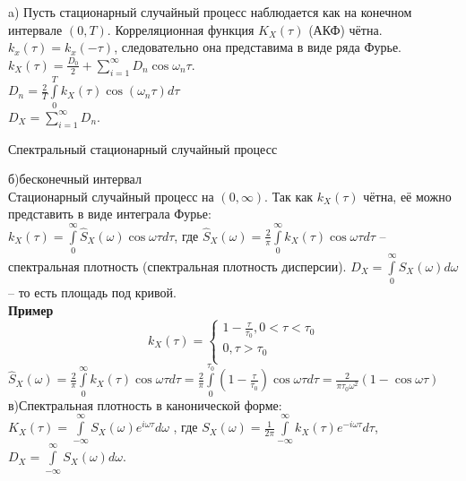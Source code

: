 \documentclass[russian, 12pt, fleqn]{article}
\begin{document}
a) Пусть стационарный случайный процесс наблюдается как на конечном интервале $(0, T)$. Корреляционная функция $K_X(\tau)$ (АКФ) чётна. $k_x(\tau) = k_x(-\tau)$, следовательно она представима в виде ряда Фурье. $k_X(\tau) = \frac{D_0}{2} +  \displaystyle{\sum \limits_{i = 1}^{\infty}} D_n \cos \omega_n \tau$.\\
$D_n = \frac{2}{T} \displaystyle{\int \limits _{0} ^ {T}} k_X (\tau) \cos(\omega_n \tau) d\tau$\\
$D_X =   \displaystyle{\sum \limits_{i = 1}^{\infty}} D_n$.
\begin{center}
$\textbf{Спектральный стационарный случайный процесс}$
\end{center}
б)бесконечный интервал\\
Стационарный случайный процесс на $(0, \infty)$. Так как $k_X(\tau)$ чётна, её можно представить в виде интеграла Фурье:\\
$k_X(\tau) = \displaystyle{\int \limits_{0}^{\infty}} \hat{S}_X(\omega) \cos \omega \tau d\tau$, где $\hat{S}_X (\omega) = \frac{2}{\pi}  \displaystyle{\int \limits_{0}^{\infty}} k_X(\tau) \cos \omega \tau d\tau$ -- спектральная плотность (спектральная плотность дисперсии). $D_X =  \displaystyle{\int \limits_{0}^{\infty}} S_X(\omega) d\omega$ -- то есть площадь под кривой.\\
  \textbf{Пример}\\ 
\begin{equation*} 
k_X(\tau)=
 \begin{cases}
   1 - \frac{\tau}{\tau_0}, 0 < \tau < \tau_0 \\
   0 , \tau > \tau_0\\
 \end{cases}
\end{equation*}
$\hat{S}_X(\omega)  = \frac{2}{\pi} \displaystyle{\int \limits_{0}^{\infty}}k_X(\tau) \cos \omega \tau d\tau = \frac{2}{\pi}\displaystyle{\int \limits_{0}^{\tau_0}} (1 - \frac{\tau}{\tau_0}) \cos \omega \tau d \tau = \frac{2}{\pi \tau_0 \omega^2} (1 - \cos \omega \tau)$\\
в)Спектральная плотность в канонической форме:\\
$K_X(\tau) = \displaystyle{\int \limits_{-\infty}^{\infty}} S_X(\omega)e^{i\omega \tau} d\omega$ , где $S_X(\omega) = \frac{1}{2\pi} \displaystyle{\int \limits_{-\infty}^{\infty}} k_X(\tau) e^{-i\omega \tau} d\tau$, $D_X = \displaystyle{\int \limits_{-\infty}^{\infty}} S_X(\omega) d \omega$.\\
\end{document}
